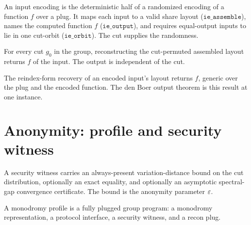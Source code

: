 \begin{definition}
  \label{def:input_encoding}
  \rocqok
  An input encoding is the deterministic half of a randomized encoding of a
  function $f$ over a plug. It maps each input to a valid share layout
  ($\mathtt{ie\_assemble}$), names the computed function $f$
  ($\mathtt{ie\_output}$), and requires equal-output inputs to lie in one
  cut-orbit ($\mathtt{ie\_orbit}$). The cut supplies the randomness.
\end{definition}

\begin{theorem}
  \label{thm:ie_output_correct}
  \rocqok
  For every cut $g_0$ in the group, reconstructing the cut-permuted assembled
  layout returns $f$ of the input. The output is independent of the cut.
\end{theorem}

\begin{theorem}
  \label{thm:recon_from_layout_output}
  \rocqok
  The reindex-form recovery of an encoded input's layout returns $f$, generic
  over the plug and the encoded function. The den Boer output theorem is this
  result at one instance.
\end{theorem}

\chapter{Anonymity: profile and security witness}

\begin{definition}
  \label{def:security_witness}
  \rocqok
  A security witness carries an always-present variation-distance bound on the
  cut distribution, optionally an exact equality, and optionally an asymptotic
  spectral-gap convergence certificate. The bound is the anonymity parameter
  $\varepsilon$.
\end{definition}

\begin{definition}
  \label{def:monodromy_profile}
  \rocqok
  A monodromy profile is a fully plugged group program: a monodromy
  representation, a protocol interface, a security witness, and a recon plug.
\end{definition}

